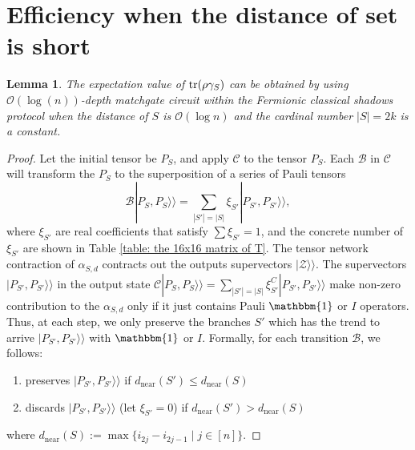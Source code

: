 \documentclass[showpacs,twocolumn,aps,prx,long bibliography,superscriptaddress,notitlepage]{revtex4-1}
\newtheorem{lemma}{Lemma}
\newcommand{\supket}[1]{|#1 \rangle\rangle}
\begin{document}
\section{Efficiency when the distance of set is short}
\label{appendix efficiency}
\begin{lemma}
\label{lemma: 7}
The expectation value of $\tr(\rho \gamma_S)$ can be obtained by using $\mathcal{O}(\log(n))$-depth matchgate circuit within the Fermionic classical shadows protocol when the distance of $S$ is $\mathcal{O}(\log n)$ and the cardinal number $|S| = 2k$ is a constant. 
\end{lemma}

\begin{proof}
    Let the initial tensor be $P_S$, and apply $\mathcal{C}$ to the tensor $P_S$. Each $\mathcal{B}$ in $\mathcal{C}$ will transform the $P_S$ to the superposition of a series of Pauli tensors
    \begin{equation}
        \mathcal{B} \supket{P_{S}, P_{S}} = \sum_{|S'| = |S|} \xi_{S'} \supket{P_{S'}, P_{S'}},
    \end{equation}
    where $\xi_{S'}$ are real coefficients that satisfy $\sum \xi_{S'} = 1$, and the concrete number of $\xi_{S'}$ are shown in Table \ref{table: the 16x16 matrix of T}.
    The tensor network contraction of $\alpha_{S,d}$ contracts out the 
    outputs supervectors $ \supket{\mathcal{Z}}$. The supervectors $\supket{P_{S'}, P_{S'}}$ in the output state $\mathcal{C} \supket{P_{S}, P_{S}} = \sum_{|S'| = |S|} \xi_{S'}^{C} \supket{P_{S'}, P_{S'}}$ make non-zero contribution to the $\alpha_{S,d}$ only if it just contains Pauli $\mathbbm{1}$ or $I$ operators. Thus, at each step, we only preserve the branches $S'$ which has the trend to arrive $\supket{P_{S'}, P_{S'}}$ with $\mathbbm{1}$ or $I$. Formally, for each transition $\mathcal{B}$, we follows:
    \begin{enumerate}
        \item preserves $\supket{P_{S'}, P_{S'}}$ if $d_\text{near}(S')\leq d_\text{near}(S)$
        \item discards $\supket{P_{S'}, P_{S'}}$ (let $\xi_{S'} = 0$) if $d_\text{near}(S')> d_\text{near}(S)$
     \end{enumerate}
    where $d_\text{near}(S):= \max\{ i_{2j} - i_{2j-1} \mid j \in [n] \}$. 
    
    


\end{proof}
\end{document}

